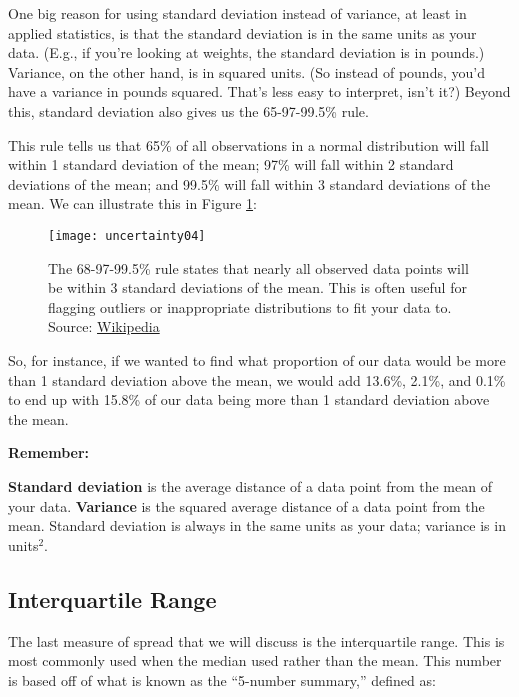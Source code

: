 One big reason for using standard deviation instead of variance, at least in applied statistics, is that the standard deviation is in the same units as your data. (E.g., if you're looking at weights, the standard deviation is in pounds.) Variance, on the other hand, is in squared units. (So instead of pounds, you'd have a variance in pounds squared. That's less easy to interpret, isn't it?) Beyond this, standard deviation also gives us the 65-97-99.5\% rule.

This rule tells us that 65\% of all observations in a normal distribution will fall within 1 standard deviation of the mean; 97\% will fall within 2 standard deviations of the mean; and 99.5\% will fall within 3 standard deviations of the mean. We can illustrate this in Figure \ref{fig:uncertainty04}:

\begin{figure}[h!]
\texttt{[image: uncertainty04]}
\caption{The 68-97-99.5\% rule states that nearly all observed data points will be within 3 standard deviations of the mean. This is often useful for flagging outliers or inappropriate distributions to fit your data to. Source: \href{http://en.wikipedia.org/wiki/Standard_deviation}{Wikipedia}}
\label{fig:uncertainty04}
\end{figure}

So, for instance, if we wanted to find what proportion of our data would be more than 1 standard deviation above the mean, we would add 13.6\%, 2.1\%, and 0.1\% to end up with 15.8\% of our data being more than 1 standard deviation above the mean.

\begin{framed}
\noindent \textbf{{\large Remember:}}

\textbf{Standard deviation} is the average distance of a data point from the mean of your data. \textbf{Variance} is the squared average distance of a data point from the mean. Standard deviation is always in the same units as your data; variance is in units\(^2\).
\end{framed}

\subsection{Interquartile Range}
The last measure of spread that we will discuss is the interquartile range. This is most commonly used when the median used rather than the mean. This number is based off of what is known as the ``5-number summary,'' defined as:

